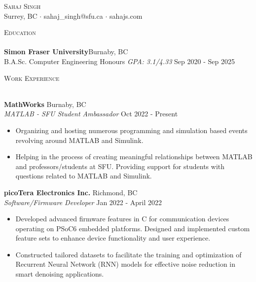 \documentclass[a4paper]{article}
\newcommand{\lineunder} {
    \vspace*{-8pt} \\
    \hspace*{-18pt} \hrulefill \\
}
\newcommand{\header} [1] {
    {\hspace*{-18pt}\vspace*{6pt} \textsc{#1}}
    \vspace*{-6pt} \lineunder
}
\begin{document}
\vspace*{-40pt}

    

\vspace*{-10pt}
\begin{center}
	{\Huge \scshape {Sahaj Singh}}\\
	Surrey, BC $\cdot$ sahaj\_singh@sfu.ca $\cdot$ sahajs.com\\
\end{center}

\header{Education}
\textbf{Simon Fraser University}\hfill Burnaby, BC\\
B.A.Sc. Computer Engineering Honours \textit{GPA: 3.1/4.33} \hfill Sep 2020 - Sep 2025\\
\vspace{2mm}

\header{Work Experience}
\vspace{1mm}

\textbf{MathWorks} \hfill Burnaby, BC\\
\textit{MATLAB - SFU Student Ambassador} \hfill Oct 2022 - Present\\
\vspace{-1mm}
\begin{itemize} \itemsep 1pt
	\item Organizing and hosting numerous programming and simulation based events revolving around MATLAB and Simulink.
	\item Helping in the process of creating meaningful relationships between MATLAB and professors/students at SFU. Providing support for students with questions related to MATLAB and Simulink.
\end{itemize}
\textbf{picoTera Electronics Inc.} \hfill Richmond, BC\\
\textit{Software/Firmware Developer} \hfill Jan 2022 - April 2022\\
\vspace{-1mm}
\begin{itemize} \itemsep 1pt
	\item Developed advanced firmware features in C for communication devices operating on PSoC6 embedded platforms. Designed and implemented custom feature sets to enhance device functionality and user experience.
	\item Constructed tailored datasets to facilitate the training and optimization of Recurrent Neural Network (RNN) models for effective noise reduction in smart denoising applications.
\end{itemize}
\end{document}
